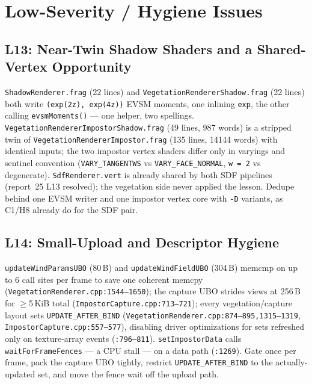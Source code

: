 \documentclass[11pt,a4paper]{article}
\begin{document}
\section{Low-Severity / Hygiene Issues}

\subsection{L13: Near-Twin Shadow Shaders and a Shared-Vertex Opportunity}

\texttt{ShadowRenderer.frag} (22 lines) and
\texttt{VegetationRendererShadow.frag} (22 lines) both write
\texttt{(exp(2z), exp(4z))} EVSM moments, one inlining \texttt{exp}, the
other calling \texttt{evsmMoments()} --- one helper, two spellings.
\texttt{VegetationRendererImpostorShadow.frag} (49 lines, 987 words) is a
stripped twin of \texttt{VegetationRendererImpostor.frag} (135 lines,
14144 words) with identical inputs; the two impostor vertex shaders differ
only in varyings and sentinel convention
(\texttt{VARY\_TANGENTWS} vs \texttt{VARY\_FACE\_NORMAL}, \texttt{w = 2}
vs degenerate). \texttt{SdfRenderer.vert} is already shared by both SDF
pipelines (report~25 L13 resolved); the vegetation side never applied the
lesson. Dedupe behind one EVSM writer and one impostor vertex core with
\texttt{-D} variants, as C1/H8 already do for the SDF pair.

\subsection{L14: Small-Upload and Descriptor Hygiene}

\texttt{updateWindParamsUBO} (80\,B) and \texttt{updateWindFieldUBO}
(304\,B) memcmp on up to 6 call sites per frame to save one coherent memcpy
(\texttt{VegetationRenderer.cpp:1544--1650}); the capture UBO strides views
at 256\,B for $\ge$5\,KiB total (\texttt{ImpostorCapture.cpp:713--721});
every vegetation/capture layout sets \texttt{UPDATE\_AFTER\_BIND}
(\texttt{VegetationRenderer.cpp:874--895,1315--1319},
\texttt{ImpostorCapture.cpp:557--577}), disabling driver optimizations for
sets refreshed only on texture-array events (\texttt{:796--811}).
\texttt{setImpostorData} calls \texttt{waitForFrameFences} --- a CPU stall
--- on a data path (\texttt{:1269}). Gate once per frame, pack the capture
UBO tightly, restrict \texttt{UPDATE\_AFTER\_BIND} to the actually-updated
set, and move the fence wait off the upload path.
\end{document}
